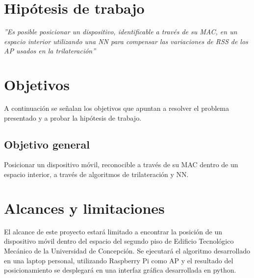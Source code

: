
                \clearpage 

\section{Hipótesis de trabajo}
\begin{center}
\textit{''Es posible posicionar un dispositivo, identificable a través de su MAC, en un espacio interior utilizando una \ac{NN} para compensar las variaciones de RSS de los \ac{AP} usados en la trilateración''}
\end{center}

\section{Objetivos}
A continuación se señalan los objetivos que apuntan a resolver el problema presentado y a probar la hipótesis de trabajo.

\subsection{Objetivo general}
Posicionar un dispositivo móvil, reconocible a través de su \ac{MAC} dentro de un espacio interior, a través de algoritmos de trilateración y \ac{NN}.


\section{Alcances y limitaciones}
El alcance de este proyecto estará limitado a encontrar la posición de un dispositivo móvil dentro del espacio del segundo piso de Edificio Tecnológico Mecánico de la Universidad de Concepción. Se ejecutará el algoritmo desarrollado en una laptop personal, utilizando Raspberry Pi como \ac{AP} y el resultado del posicionamiento se desplegará en una interfaz gráfica desarrollada en python.

